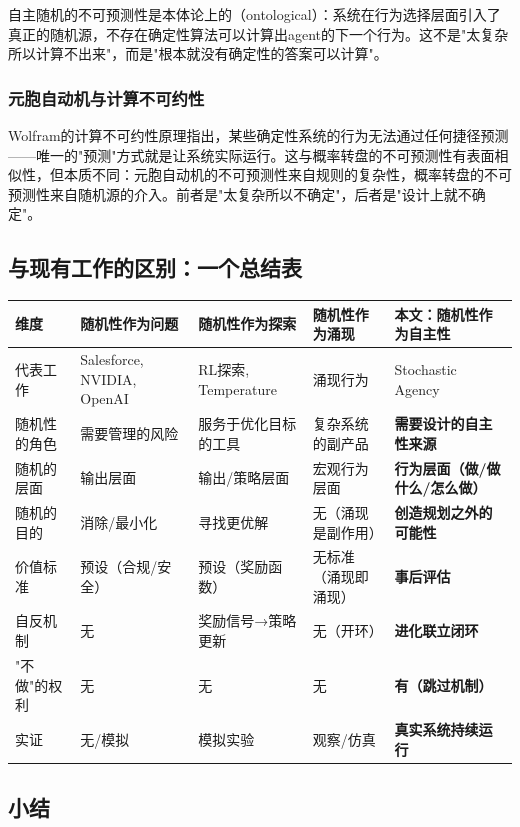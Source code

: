 \documentclass[12pt,a4paper]{ctexart}
\begin{document}
自主随机的不可预测性是本体论上的（ontological）：系统在行为选择层面引入了真正的随机源，不存在确定性算法可以计算出agent的下一个行为。这不是"太复杂所以计算不出来"，而是"根本就没有确定性的答案可以计算"。

\subsubsection{元胞自动机与计算不可约性}

Wolfram的计算不可约性原理\cite{wolfram2002}指出，某些确定性系统的行为无法通过任何捷径预测——唯一的"预测"方式就是让系统实际运行。这与概率转盘的不可预测性有表面相似性，但本质不同：元胞自动机的不可预测性来自规则的复杂性，概率转盘的不可预测性来自随机源的介入。前者是"太复杂所以不确定"，后者是"设计上就不确定"。

\subsection{与现有工作的区别：一个总结表}

\begin{table}[h]
\centering
\small
\begin{tabular}{p{2cm}p{2.5cm}p{2.5cm}p{2.5cm}p{2.8cm}}
\toprule
维度 & 随机性作为问题 & 随机性作为探索 & 随机性作为涌现 & \textbf{本文：随机性作为自主性} \\
\midrule
代表工作 & Salesforce, NVIDIA, OpenAI & RL探索, Temperature & 涌现行为 & Stochastic Agency \\
随机性的角色 & 需要管理的风险 & 服务于优化目标的工具 & 复杂系统的副产品 & \textbf{需要设计的自主性来源} \\
随机的层面 & 输出层面 & 输出/策略层面 & 宏观行为层面 & \textbf{行为层面（做/做什么/怎么做）} \\
随机的目的 & 消除/最小化 & 寻找更优解 & 无（涌现是副作用） & \textbf{创造规划之外的可能性} \\
价值标准 & 预设（合规/安全） & 预设（奖励函数） & 无标准（涌现即涌现） & \textbf{事后评估} \\
自反机制 & 无 & 奖励信号→策略更新 & 无（开环） & \textbf{进化联立闭环} \\
"不做"的权利 & 无 & 无 & 无 & \textbf{有（跳过机制）} \\
实证 & 无/模拟 & 模拟实验 & 观察/仿真 & \textbf{真实系统持续运行} \\
\bottomrule
\end{tabular}
\end{table}

\subsection{小结}
\end{document}
